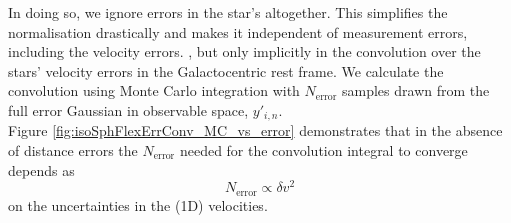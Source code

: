 In doing so, we ignore errors in the star's  altogether. This simplifies the normalisation drastically and makes it independent of measurement errors, including the velocity errors. , but only implicitly in the convolution over the stars' velocity errors in the Galactocentric rest frame. We calculate the convolution using Monte Carlo integration with $N_\text{error}$ samples drawn from the full error Gaussian in observable space, $y'_{i,n}$. 
\\Figure \ref{fig:isoSphFlexErrConv_MC_vs_error} demonstrates that in the absence of distance errors the $N_\text{error}$ needed for the convolution integral to converge depends as
\begin{equation*}
N_\text{error} \propto \delta v^2
\end{equation*}
on the uncertainties in the (1D) velocities.


